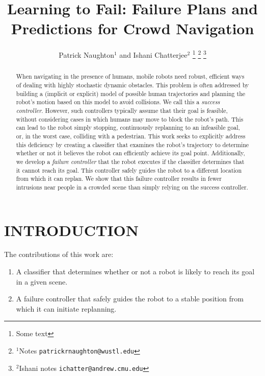 \documentclass[letterpaper, 10 pt, conference]{ieeeconf}  %
\title{\LARGE \bf
	Learning to Fail: Failure Plans and Predictions for Crowd Navigation
}
\author{Patrick Naughton$^{1}$ and Ishani Chatterjee$^{2}$%
\thanks{Some text}%
\thanks{$^{1}$Notes
        {\tt\small patrickrnaughton@wustl.edu}}%
\thanks{$^{2}$Ishani notes
        {\tt\small ichatter@andrew.cmu.edu}}%
}
\begin{document}
\maketitle
\thispagestyle{empty}
\pagestyle{empty}


\begin{abstract}
	When navigating in the presence of humans, mobile robots need robust, efficient ways of dealing with highly stochastic dynamic obstacles. This problem is often addressed by building a (implicit or explicit) model of possible human trajectories and planning the robot's motion based on this model to avoid collisions. We call this a \textit{success controller}. However, such controllers typically assume that their goal is feasible, without considering cases in which humans may move to block the robot's path. This can lead to the robot simply stopping, continuously replanning to an infeasible goal, or, in the worst case, colliding with a pedestrian. This work seeks to explicitly address this deficiency by creating a classifier that examines the robot's trajectory to determine whether or not it believes the robot can efficiently achieve its goal point. Additionally, we develop a \textit{failure controller} that the robot executes if the classifier determines that it cannot reach its goal. This controller safely guides the robot to a different location from which it can replan. We show that this failure controller results in fewer intrusions near people in a crowded scene than simply relying on the success controller.
\end{abstract}


\section{INTRODUCTION}

	The contributions of this work are:
	\begin{enumerate}
		\item A classifier that determines whether or not a robot is likely to reach its goal in a given scene.
		\item A failure controller that safely guides the robot to a stable position from which it can initiate replanning.
	\end{enumerate}
	
\end{document}
